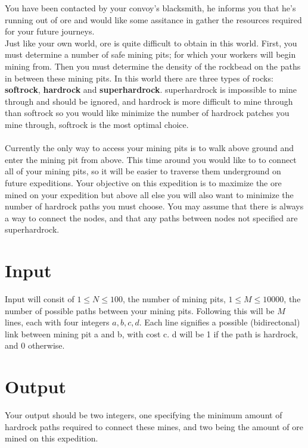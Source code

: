 
\noindent You have been contacted by your convoy's blacksmith, he informs you that he's running out of ore and would like
some assitance in gather the resources required for your future journeys.\\

\noindent Just like your own world, ore is quite difficult to obtain in this world.  First, you must determine
a number of safe mining pits; for which your workers will begin mining from. Then you must determine the density
of the rockbead on the paths in between these mining pits. In this world there are three types of rocks:
\textbf{softrock}, \textbf{hardrock} and \textbf{superhardrock}. superhardrock is impossible to mine through and should
be ignored, and hardrock is more difficult to mine through than softrock so you would like minimize
the number of hardrock patches you mine through, softrock is the most optimal choice.\\ \\

\noindent Currently the only way to access your mining pits is to walk above ground and enter the mining pit from above.
This time around you would like to to connect all of your mining pits, so it will be easier to traverse them underground
on future expeditions. Your objective on this expedition is to maximize the ore mined on your expedition but above all
else you will also want to minimize the number of hardrock paths you must choose. You may assume that there is always a
way to connect the nodes, and that any paths between nodes not specified are superhardrock.


\section*{Input}
Input will consit of $1 \leq N \leq 100$, the number of mining pits, $1 \leq M \leq 10000$, the number of possible paths
between your mining pits. Following this will be $M$ lines, each with four integers $a,b,c,d$. Each line signifies a
possible (bidirectonal) link between mining pit a and b, with cost c. d will be 1 if the path is hardrock, and 0
otherwise.

\section*{Output}
Your output should be two integers, one specifying the minimum amount of hardrock paths required to connect these mines,
and two being the amount of ore mined on this expedition.

